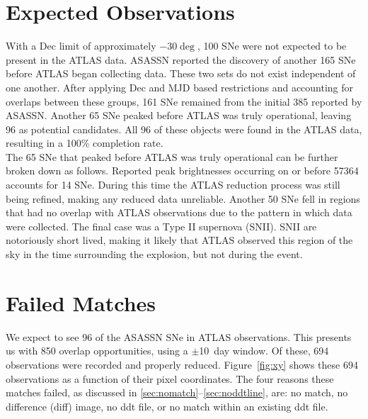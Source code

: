 \section{Expected Observations}\label{sec:expobs}

\indent With a Dec limit of approximately $-30\deg$, 100 SNe were not 
expected to be present in the ATLAS data.  
ASASSN reported the discovery of another 165 SNe before ATLAS began collecting data. 
These two sets do not exist independent of one another. 
After applying Dec and MJD based restrictions and accounting for overlaps between 
these groups, 161 SNe remained from the initial 385 reported by ASASSN. 
Another 65 SNe peaked before ATLAS was truly operational, leaving 96 as potential candidates.  
All 96 of these objects were found in the ATLAS data, resulting in a 100\% completion rate.\\
%
\indent The 65 SNe that peaked before ATLAS was truly operational can be further broken down as follows.  
Reported peak brightnesses occurring on or before 57364 accounts for 14 SNe.  
During this time the ATLAS reduction process was still being refined, making 
any reduced data unreliable.  
Another 50 SNe fell in regions that had no overlap with ATLAS observations due 
to the pattern in which data were collected.  
The final case was a Type II supernova (SNII).  
SNII are notoriously short lived, making it likely that ATLAS observed this region of the sky in the 
time surrounding the explosion, but not during the event.


\section{Failed Matches}\label{sec:failmatch}

We expect to see 96 of the ASASSN SNe in ATLAS observations. 
This presents us with 850 overlap opportunities, using a 
$\pm$10~day window.  Of these, 694 observations were recorded 
and properly reduced.  
Figure~\ref{fig:xy} shows these 694 observations as a function of their 
pixel coordinates.  
The four reasons these matches failed, as discussed in 
\cref{sec:nomatch}--\cref{sec:noddtline}, are: no match, no difference (diff) 
image, no ddt file, or no match within an existing ddt file.

